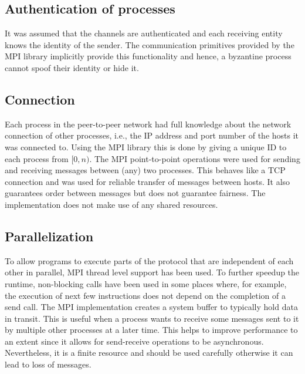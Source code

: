 \subsection{Authentication of processes}
It was assumed that the channels are authenticated and each receiving entity knows the identity of the sender. The communication primitives provided by the MPI library implicitly provide this functionality and hence, a byzantine process cannot spoof their identity or hide it.

\subsection{Connection}
Each process in the peer-to-peer network had full knowledge about the network connection of other processes, i.e., the IP address and port number of the hosts it was connected to. Using the MPI library this is done by giving a unique ID to each process from $[0, n)$. The MPI point-to-point operations were used for sending and receiving messages between (any) two processes. This behaves like a TCP connection and was used for reliable transfer of messages between hosts. It also guarantees order between messages but does not guarantee fairness. The implementation does not make use of any shared resources.

\subsection{Parallelization}
To allow programs to execute parts of the protocol that are independent of each other in parallel, MPI thread level support has been used. To further speedup the runtime, non-blocking calls have been used in some places where, for example, the execution of next few instructions does not depend on the completion of a send call. The MPI implementation creates a system buffer to typically hold data in transit. This is useful when a process wants to receive some messages sent to it by multiple other processes at a later time. This helps to improve performance to an extent since it allows for send-receive operations to be asynchronous. Nevertheless, it is a finite resource and should be used carefully otherwise it can lead to loss of messages. 

